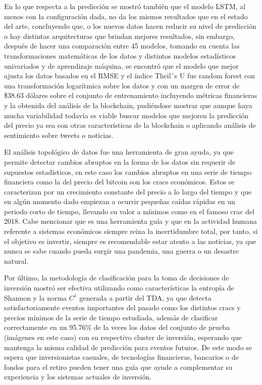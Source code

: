 En lo que respecta a la predicción se mostró también que el modelo LSTM, al menos con la configuración dada, no da los mismos resultados que en el estado del arte, concluyendo que, o los nuevos datos hacen reducir su nivel de predicción o hay distintas arquitecturas que brindan mejores resultados, sin embargo, después de hacer una comparación entre 45 modelos, tomando en cuenta las transformaciones matemáticas de los datos y distintos modelos estadísticos univariados y de aprendizaje máquina, se encontró que el modelo que mejor ajusta los datos basados en el RMSE y el índice Theil´s U fue random forest con una transformación logarítmica sobre los datos y con un margen de error de \$38.63 dólares sobre el conjunto de entrenamiento incluyendo métricas financieras y la obtenida del análisis de la blockchain, pudiéndose mostrar que aunque haya mucha variabilidad todavía es viable buscar modelos que mejoren la predicción del precio ya sea con otras características de la blockchain o aplicando análisis de sentimiento sobre tweets o noticias.

El análisis topológico de datos fue una herramienta de gran ayuda, ya que permite detectar cambios abruptos en la forma de los datos sin requerir de supuestos estadísticos, en este caso los cambios abruptos en una serie de tiempo financiera como la del precio del bitcoin son los cracs económicos. Estos se caracterizan por un crecimiento constante del precio a lo largo del tiempo y que en algún momento dado empiezan a ocurrir pequeñas caídas rápidas en un periodo corto de tiempo, llevando su valor a mínimos como en el famoso crac del 2018. Cabe mencionar que es una herramienta guía y que en la actividad humana referente a sistemas económicos siempre reina la incertidumbre total, por tanto, si el objetivo es invertir, siempre es recomendable estar atento a las noticias, ya que nunca se sabe cuando pueda surgir una pandemia, una guerra o un desastre natural.

Por último, la metodología de clasificación para la toma de decisiones de inversión mostró ser efectiva utilizando como características la entropía de Shannon y la norma $C^1$ generada a partir del TDA, ya que detecta satisfactoriamente eventos importantes del pasado como los distintos cracs y precios mínimos de la serie de tiempo estudiada, además de clasificar correctamente en un 95.76\% de la veces los datos del conjunto de prueba (imágenes en este caso) con su respectivo cluster de inversión, esperando que mantenga la misma calidad de predicción para eventos futuros. De este modo se espera que inversionistas casuales, de tecnologías financieras, bancarios o de fondos para el retiro pueden tener una guía que ayude a complementar su experiencia y los sistemas actuales de inversión.

